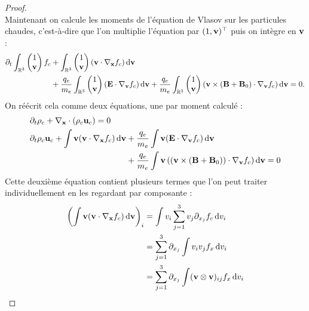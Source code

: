 \begin{proof}
$$  $$
  Maintenant on calcule les moments de l'équation de Vlasov sur les particules chaudes, c'est-à-dire que l'on multiplie l'équation par $(1,\vb{v})^\top$ puis on intègre en $\vb{v}$ :
  $$
    \begin{aligned}
    \partial_t\int_{\mathbb{R}^3} \begin{pmatrix}
      1 \\
      \vb{v}
    \end{pmatrix}f_c
    &+
    \int_{\mathbb{R}^3}\begin{pmatrix}
      1 \\
      \vb{v}
    \end{pmatrix}(\vb{v}\cdot\nabla_{\vb{x}}f_c)\dd{\vb{v}} \\
    &+
    \frac{q_e}{m_e}\int_{\mathbb{R}^3}\begin{pmatrix}
      1 \\
      \vb{v}
    \end{pmatrix} (\vb{E}\cdot\nabla_{\vb{v}}f_c)\dd{\vb{v}}
    +
    \frac{q_e}{m_e}\int_{\mathbb{R}^3}\begin{pmatrix}
      1 \\
      \vb{v}
    \end{pmatrix}(\vb{v}\times(\vb{B}+\vb{B}_0) \cdot\nabla_{\vb{v}}f_c)\dd{\vb{v}}
    = 0.
    \end{aligned}
  $$
  On réécrit cela comme deux équations, une par moment calculé :
  $$
    \begin{aligned}
      &\partial_t\rho_c + \nabla_{\vb{x}}\cdot(\rho_c\vb{u}_c) = 0 \\
      &\partial_t\rho_c\vb{u}_c + \int\vb{v}(\vb{v}\cdot\nabla_{\vb{x}}f_c)\dd{\vb{v}} + \frac{q_e}{m_e}\int\vb{v}(\vb{E}\cdot\nabla_{\vb{v}}f_c)\dd{\vb{v}} \\
      &\phantom{\partial_t\rho_c\vb{u}_c + \int\vb{v}(\vb{v}\cdot\nabla_{\vb{x}}f_c)\dd{\vb{v}}}
        + \frac{q_e}{m_e}\int\vb{v}\left((\vb{v}\times(\vb{B}+\vb{B}_0))\cdot\nabla_{\vb{v}}f_c\right)\dd{\vb{v}} = 0
    \end{aligned}
  $$
  Cette deuxième équation contient plusieurs termes que l'on peut traiter individuellement en les regardant par composante :
  $$
    \begin{aligned}
      \left( \int\vb{v}(\vb{v}\cdot\nabla_{\vb{x}}f_c)\dd{\vb{v}} \right)_i
          &= \int v_i \sum_{j=1}^3v_j\partial_{x_j}f_c\dd{v_i} \\
          &= \sum_{j=1}^3\partial_{x_j}\int v_iv_jf_x\dd{v_i} \\
          &= \sum_{j=1}^3\partial_{x_j}\int (\vb{v}\otimes\vb{v})_{ij}f_x\dd{v_i} \\

\end{aligned}$$
\end{proof}
